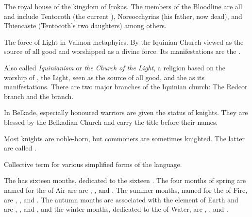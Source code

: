\begin{gloss}
The royal house of the kingdom of Irokas. The members of the Bloodline are all \dragons{} and include Tentocoth (the current \DragonKing{}), Noreocchyrias (his father, now dead), \Criocas{} and Thiencaste (Tentocoth's two daughters) among others. 



\gitem{\iquin{}}
The force of Light in Vaimon metaphyics. By the Iquinian Church viewed as the source of all good and worshipped as a divine force. Its manifestations are the \Sephiroth. 



Also called \emph{Iquinianism} or \emph{the Church of the Light}, a religion based on the worship of \iquin{}, the Light, seen as the source of all good, and the \Sephiroth{} as its manifestations. There are two major branches of the Iquinian church: The Redcor branch and the \Yrgell{} branch. 



In Belkade, especially honoured warriors are given the status of knights. They are blessed by the Belkadian Church and carry the title  before their names. 

\label{hedge knight}
Most knights are noble-born, but commoners are sometimes knighted. The latter are called . 



\gitem{\Lowtongue}
Collective term for various simplified forms of the \Draconic{} language.  







The \ImperialCalendar{} has sixteen months, dedicated to the sixteen \Sephiroth{}.
The four months of spring are named for the \Sephiroth{} of Air are are \Atzirah{}, \Razilah, \Keshirah{} and \Feazirah{}. The summer months, named for the \Sephiroth{} of Fire, are \Barion{}, \Teshiron, \Izion{} and \Hapheron. The autumn months are associated with the element of Earth and are \Thimared, \Yemared, \Cushed{} and \Hoshied, and the winter months, dedicated to the \Sephiroth{} of Water, are \Omariel, \Yeziel, \Ishiel{} and \Gamishiel. 


\end{gloss}
